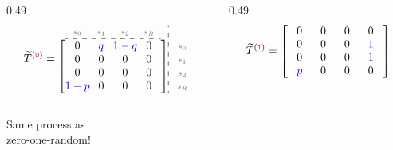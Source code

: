 \documentclass[aspectratio=169,11pt]{beamer}
\newcommand{\ec}[1]{\makebox[2.15em]{\ensuremath{#1}}}          %
\newcommand{\lc}[1]{\makebox[2.15em]{\ensuremath{\scriptstyle\color{black!55}#1}}} %
\begin{document}
\begin{frame}
  \vspace{0.1em}
  \begin{columns}[c]
    \begin{column}{0.49\textwidth}
      \[
        \widetilde{T}^{({\color{red}\mathtt{0}})} =
        \begin{array}{@{}c@{}}
          \begin{array}{@{}c@{}c@{}c@{}c@{}}
            \lc{s_0}&\lc{s_1}&\lc{s_2}&\lc{s_R}\\\hdashline\end{array}\\[0.1em]
          \left[\begin{array}{@{}c@{}c@{}c@{}c@{}}
            \ec{0}&\ec{\color{blue}q}&\ec{\color{blue}1-q}&\ec{0}\\
            \ec{0}&\ec{0}&\ec{0}&\ec{0}\\
            \ec{0}&\ec{0}&\ec{0}&\ec{0}\\
            \ec{\color{blue}1-p}&\ec{0}&\ec{0}&\ec{0}
          \end{array}\right]
        \end{array}
        \begin{array}{:@{\,}l@{}}\\[0.1em]\lc{s_0}\\ \lc{s_1}\\ \lc{s_2}\\ \lc{s_R}\end{array}
      \]
    \end{column}
    \begin{column}{0.49\textwidth}
      \[
        \widetilde{T}^{({\color{red}\mathtt{1}})} =
        \left[\begin{array}{@{}c@{}c@{}c@{}c@{}}
          \ec{0}&\ec{0}&\ec{0}&\ec{0}\\
          \ec{0}&\ec{0}&\ec{0}&\ec{\color{blue}1}\\
          \ec{0}&\ec{0}&\ec{0}&\ec{\color{blue}1}\\
          \ec{\color{blue}p}&\ec{0}&\ec{0}&\ec{0}
        \end{array}\right]
      \]
    \end{column}
  \end{columns}
  \vspace{-0.62\textheight}
  \begin{center}
  \begin{tcolorbox}[width=0.72\textwidth,colback=yellow!6,colframe=black!25,
                    boxrule=0.6pt,arc=2pt,halign=center]
    {\color{red}\Large Same process as\\[0.4em] zero-one-random!}
  \end{tcolorbox}
  \end{center}
\end{frame}
\end{document}

